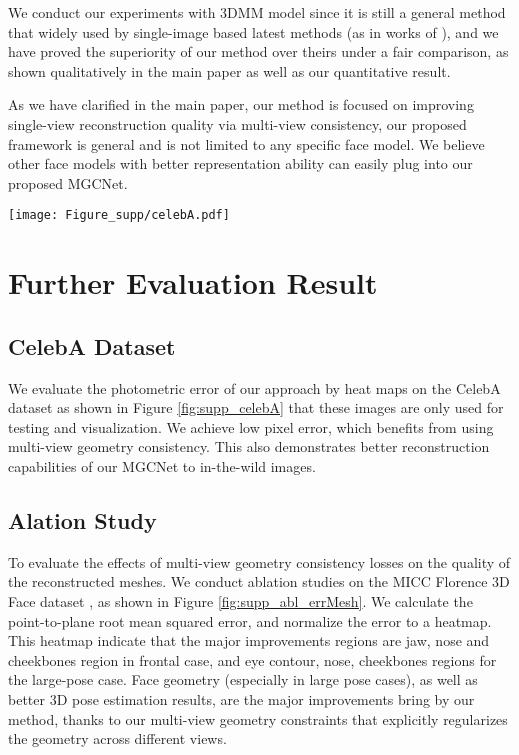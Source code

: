 \documentclass[runningheads]{llncs}
\begin{document}
We conduct our experiments with 3DMM model since it is still a general method that widely used by single-image based latest methods (as in works of \cite{unsuper_zhou2019dense,dataset_aflw20003D_300WLP_zhu2016face,unsuper_genova2018unsupervised,super_fit_endtoend_iter_tuan2017regressing,unsuper_mul_ng2019accurate,unsuper_tewari2017mofa}), and we have proved the superiority of our method over theirs under a fair comparison, as shown qualitatively in the main paper as well as our quantitative result.

As we have clarified in the main paper, our method is focused on improving single-view reconstruction quality via multi-view consistency, our proposed framework is general and is not limited to any specific face model. We believe other face models with better representation ability  \cite{unsuper_mul_sanyal2019learning_ring,unsuper_mul_tewari2019fml,unsuper_tewari2018self,unsuper_tran2018nonlinear,unsuper_tran2019towards} can easily plug into our proposed MGCNet.

\begin{figure*}[htb]
	\centering
	\texttt{[image: Figure\_supp/celebA.pdf]}
	\caption{Quantitative evaluation of photometric error on the CelebA \cite{dataset_liu2015deep_celeba} dataset. The error map range is 
	}
	\label{fig:supp_celebA}
\end{figure*}

\section{Further Evaluation Result} 
\subsection{CelebA Dataset} \label{eval_celebA}
We evaluate the photometric error of our approach by heat maps on the CelebA dataset \cite{dataset_liu2015deep_celeba} as shown in Figure \ref{fig:supp_celebA} that these images are only used for testing and visualization. 
We achieve low pixel error, which benefits from using multi-view geometry consistency.
This also demonstrates better reconstruction capabilities of our MGCNet to in-the-wild images.

\subsection{Alation Study} \label{eval_abl}
To evaluate the effects of multi-view geometry consistency losses on the quality of the reconstructed meshes.
We conduct ablation studies on the MICC Florence 3D Face dataset \cite{dataset_florence}, as shown in Figure \ref{fig:supp_abl_errMesh}. We calculate the point-to-plane root mean squared error, and normalize the error to a heatmap.
This heatmap indicate that the major improvements regions are jaw, nose and cheekbones region in frontal case, and eye contour, nose, cheekbones regions for the large-pose case.
Face geometry (especially in large pose cases), as well as better 3D pose estimation results, are the major improvements bring by our method, thanks to our multi-view geometry constraints that explicitly regularizes the geometry across different views.
\end{document}
